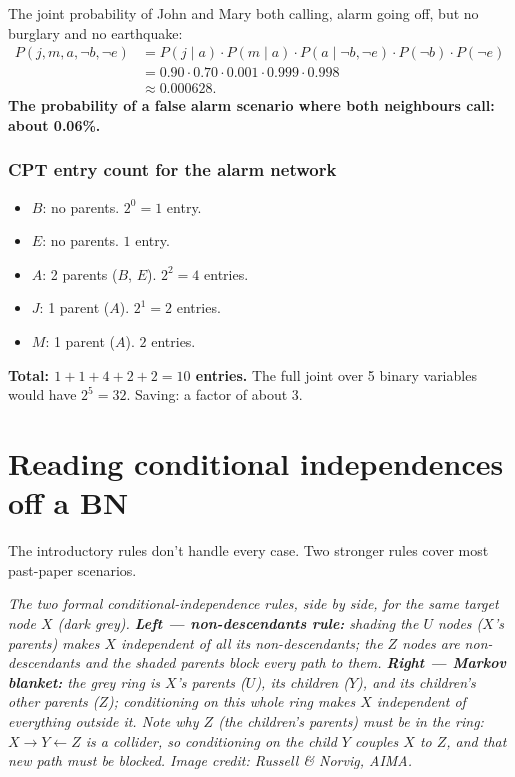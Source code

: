 \documentclass[11pt, a4paper]{article}
\begin{document}
\begin{exbox}
The joint probability of John and Mary both calling, alarm going off, but no burglary and no earthquake:
\begin{align*}
P(j, m, a, \neg b, \neg e) &= P(j \mid a) \cdot P(m \mid a) \cdot P(a \mid \neg b, \neg e) \cdot P(\neg b) \cdot P(\neg e) \\
&= 0.90 \cdot 0.70 \cdot 0.001 \cdot 0.999 \cdot 0.998 \\
&\approx 0.000628.
\end{align*}
\textbf{The probability of a false alarm scenario where both neighbours call: about 0.06\%.}
\end{exbox}

\subsubsection*{CPT entry count for the alarm network}

\begin{itemize}
  \item $B$: no parents. $2^0 = 1$ entry.
  \item $E$: no parents. $1$ entry.
  \item $A$: 2 parents ($B$, $E$). $2^2 = 4$ entries.
  \item $J$: 1 parent ($A$). $2^1 = 2$ entries.
  \item $M$: 1 parent ($A$). $2$ entries.
\end{itemize}
\textbf{Total: $1 + 1 + 4 + 2 + 2 = 10$ entries.} The full joint over 5 binary variables would have $2^5 = 32$. Saving: a factor of about 3.

\section{Reading conditional independences off a BN}

The introductory rules don't handle every case. Two stronger rules cover most past-paper scenarios.

\begin{center}

\footnotesize\textit{The two formal conditional-independence rules, side by side, for the same target node $X$ (dark grey). \textbf{Left --- non-descendants rule:} shading the $U$ nodes ($X$'s parents) makes $X$ independent of all its non-descendants; the $Z$ nodes are non-descendants and the shaded parents block every path to them. \textbf{Right --- Markov blanket:} the grey ring is $X$'s parents ($U$), its children ($Y$), \emph{and} its children's other parents ($Z$); conditioning on this whole ring makes $X$ independent of everything outside it. Note why $Z$ (the children's parents) must be in the ring: $X \to Y \leftarrow Z$ is a collider, so conditioning on the child $Y$ couples $X$ to $Z$, and that new path must be blocked. Image credit: Russell \& Norvig, AIMA.}
\end{center}
\end{document}
